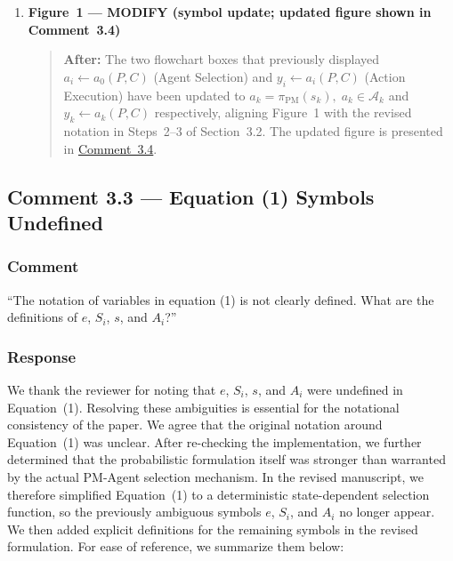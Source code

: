 \documentclass[11pt,a4paper]{article}
\begin{document}
\begin{enumerate}
\item \textbf{Figure~1 --- MODIFY (symbol update; updated figure shown in Comment~3.4)}
\begin{quote}
\textbf{After:} The two flowchart boxes that previously displayed $a_i \leftarrow a_0(P,C)$ (Agent Selection) and $y_i \leftarrow a_i(P,C)$ (Action Execution) have been updated to $a_k = \pi_{\mathrm{PM}}(s_k),\; a_k\!\in\!\mathcal{A}_k$ and $y_k \leftarrow a_k(P,C)$ respectively, aligning Figure~1 with the revised notation in Steps~2--3 of Section~3.2. The updated figure is presented in \hyperref[fig:updated-flowchart]{Comment~3.4}.
\end{quote}
\end{enumerate}

\subsection{Comment 3.3 --- Equation (1) Symbols Undefined}

\subsubsection{Comment}
``The notation of variables in equation (1) is not clearly defined. What are the definitions of $e$, $S_i$, $s$, and $A_i$?''

\subsubsection{Response}
We thank the reviewer for noting that $e$, $S_i$, $s$, and $A_i$ were undefined in Equation~(1). Resolving these ambiguities is essential for the notational consistency of the paper. We agree that the original notation around Equation~(1) was unclear. After re-checking the implementation, we further determined that the probabilistic formulation itself was stronger than warranted by the actual PM-Agent selection mechanism. In the revised manuscript, we therefore simplified Equation~(1) to a deterministic state-dependent selection function, so the previously ambiguous symbols $e$, $S_i$, and $A_i$ no longer appear. We then added explicit definitions for the remaining symbols in the revised formulation. For ease of reference, we summarize them below:
\end{document}
